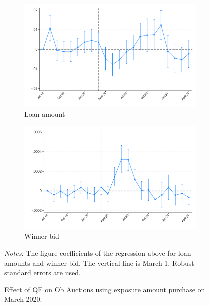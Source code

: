 \documentclass[11pt,a4paper]{article}
\begin{document}
\begin{figure}[h]
    \centering
    \begin{subfigure}[b]{0.49\textwidth}
        \includegraphics[width=0.998\textwidth]{../results/figures/did_loan_amount_expamount_march_dummy.pdf}
        \caption{ Loan amount }\label{fig:loan_amount}
       \end{subfigure}
       \begin{subfigure}[b]{0.49\textwidth}
        \includegraphics[width=0.998\textwidth]{../results/figures/did_winner_bid_expamount_march_dummy.pdf}
        \caption{ Winner bid }\label{fig:winner_bid}
       \end{subfigure}
       \caption{Effect of QE on Ob Auctions using exposure amount purchase on March 2020.}\label{fig:did_exp_amount}
     \begin{minipage}{\textwidth}
        \footnotesize{\textit{Notes:}  The figure coefficients of the regression above for loan amounts and winner bid. The vertical line is March 1.  Robust standard errors are used. }
        \end{minipage}
  \end{figure}
  
\end{document}
